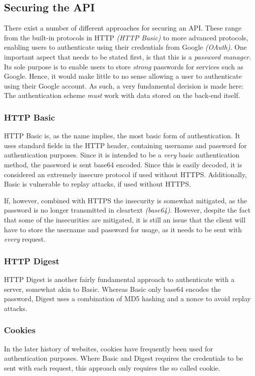		\subsection{Securing the API}
			There exist a number of different approaches for securing an API. These range from the built-in protocols in HTTP \emph{(HTTP Basic)} to more advanced protocols, enabling users to authenticate using their credentials from Google \emph{(OAuth)}. One important aspect that needs to be stated first, is that this is a \emph{password manager}. Its sole purpose is to enable users to store \emph{strong} passwords for services such as Google. Hence, it would make little to no sense allowing a user to authenticate using their Google account. As such, a very fundamental decision is made here: The authentication scheme \emph{must} work with data stored on the back-end itself.

			\subsubsection{HTTP Basic}
				HTTP Basic is, as the name implies, the most basic form of authentication. It uses standard fields in the HTTP header, containing username and password for authentication purposes. Since it is intended to be a \emph{very} basic authentication method, the password is sent base64 encoded. Since this is easily decoded, it is considered an extremely insecure protocol if used without HTTPS. Additionally, Basic is vulnerable to replay attacks, if used without HTTPS.

				If, however, combined with HTTPS the insecurity is somewhat mitigated, as the password is no longer transmitted in cleartext \emph{(base64)}. However, despite the fact that some of the insecurities are mitigated, it is still an issue that the client will have to store the username and password for usage, as it needs to be sent with \emph{every} request.

			\subsubsection{HTTP Digest}
				HTTP Digest is another fairly fundamental approach to authenticate with a server, somewhat akin to Basic. Whereas Basic only base64 encodes the password, Digest uses a combination of MD5 hashing and a nonce to avoid replay attacks. 

			\subsubsection{Cookies}
				In the later history of websites, cookies have frequently been used for authentication purposes. Where Basic and Digest requires the credentials to be sent with each request, this approach only requires the so called cookie.

